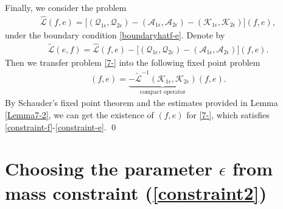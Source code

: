 \documentclass[10pt, reqno]{amsart}
\numberwithin{equation}{section}
\theoremstyle{definition}
\begin{document}
{\medskip
Finally, we consider the problem
\begin{align} \label{7-}
 \hat {\mathcal L} (f, e)
 = \Big[\left(\mathcal Q_{1\epsilon}, \mathcal Q_{2\epsilon}\right)
 - \left(\mathcal A_{1\epsilon}, \mathcal A_{2\epsilon}\right)
 - \left(\mathcal K_{1\epsilon}, \mathcal K_{2\epsilon}\right)  \Big](f, e),
\end{align}
 under the boundary condition \eqref{boundaryhatf-e}.
 Denote by
\begin{align*}
 \tilde {\mathcal L} (e,f)
 = \hat {\mathcal L} (f, e)
 - \Big[\left(\mathcal Q_{1\epsilon}, \mathcal Q_{2\epsilon}\right) - \left(\mathcal A_{1\epsilon}, \mathcal A_{2\epsilon}\right)\Big] (f,e).
\end{align*}
 Then we transfer problem \eqref{7-} into the following fixed point problem
\begin{align*}
 (f,e) = \underbrace{- \tilde {\mathcal L}^{-1} \left(\mathcal K_{1\epsilon}, \mathcal K_{2\epsilon}\right)}_{\text{compact operator}} (f,e).
\end{align*}
 By Schauder's fixed point theorem and the estimates provided in Lemma \ref{Lemma7-2}, we can get the existence of $(f, e)$ for \eqref{7-}, which satisfies \eqref{constraint-f}-\eqref{constraint-e}.
 \qed













\medskip
 \section{Choosing the parameter $\epsilon$ from mass constraint (\ref{constraint2})}\label{Section9}



}
\end{document}
